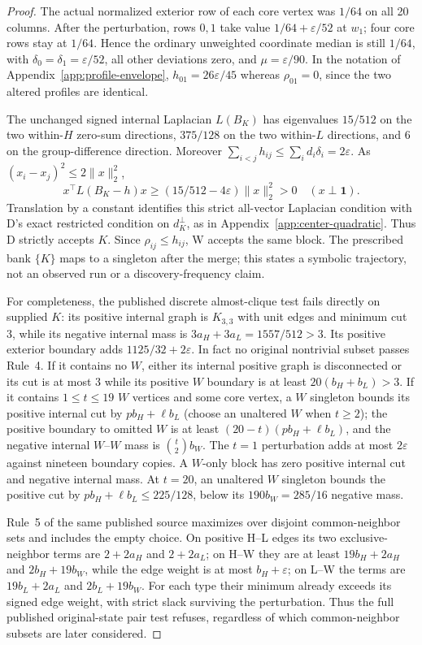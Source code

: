 \documentclass[sigconf,anonymous,review]{acmart}
\newcommand{\1}{\mathbf{1}}
\begin{document}
\begin{proof}
The actual normalized exterior row of each core vertex was $1/64$ on all
20 columns. After the perturbation, rows $0,1$ take value
$1/64+\varepsilon/52$ at $w_1$; four core rows stay at $1/64$. Hence the
ordinary unweighted coordinate median is still $1/64$, with
$\delta_0=\delta_1=\varepsilon/52$, all other deviations zero, and
$\mu=\varepsilon/90$. In the notation of
Appendix~\ref{app:profile-envelope}, $h_{01}=26\varepsilon/45$ whereas
$\rho_{01}=0$, since the two altered profiles are identical.

The unchanged signed internal Laplacian $L(B_K)$ has eigenvalues
$15/512$ on the two within-$H$ zero-sum directions, $375/128$ on the two
within-$L$ directions, and $6$ on the group-difference direction.
Moreover $\sum_{i<j}h_{ij}\le\sum_i d_i\delta_i=2\varepsilon$.
As $(x_i-x_j)^2\le2\lVert x\rVert_2^2$,
\[
x^\top L(B_K-h)x\ge
  (15/512-4\varepsilon)\lVert x\rVert_2^2>0
\quad(x\perp\1).
\]
Translation by a constant identifies this strict all-vector Laplacian
condition with D's exact restricted condition on $d_K^\perp$, as in
Appendix~\ref{app:center-quadratic}. Thus D strictly accepts $K$.
Since $\rho_{ij}\le h_{ij}$, W accepts the same block. The prescribed bank
$\{K\}$ maps to a singleton after the merge; this states a symbolic
trajectory, not an observed run or a discovery-frequency claim.

For completeness, the published discrete almost-clique test
\cite{bocker2011exact} fails directly on supplied $K$: its positive
internal graph is $K_{3,3}$ with unit edges and minimum cut 3, while its
negative internal mass is $3a_H+3a_L=1557/512>3$. Its positive exterior
boundary adds $1125/32+2\varepsilon$. In fact no original nontrivial
subset passes Rule~4. If it contains no $W$, either its internal positive
graph is disconnected or its cut is at most 3 while its positive $W$
boundary is at least $20(b_H+b_L)>3$. If it contains $1\le t\le19$
$W$ vertices and some core vertex, a $W$ singleton bounds its positive
internal cut by $pb_H+\ell b_L$ (choose an unaltered $W$ when $t\ge2$);
the positive boundary to omitted $W$ is at least
$(20-t)(pb_H+\ell b_L)$, and the negative internal $W$--$W$ mass is
$\binom{t}{2}b_W$. The $t=1$ perturbation adds at most
$2\varepsilon$ against nineteen boundary copies. A $W$-only block has
zero positive internal cut and negative internal mass. At $t=20$, an
unaltered $W$ singleton bounds the positive cut by
$pb_H+\ell b_L\le225/128$, below its $190b_W=285/16$ negative mass.

Rule~5 of the same published source maximizes over disjoint common-neighbor
sets and includes the empty choice. On positive H--L edges its two
exclusive-neighbor terms are $2+2a_H$ and $2+2a_L$; on H--W they are at least
$19b_H+2a_H$ and $2b_H+19b_W$, while the edge weight is at most
$b_H+\varepsilon$; on L--W the terms are
$19b_L+2a_L$ and $2b_L+19b_W$. For each type their minimum already exceeds
its signed edge weight, with strict slack surviving the perturbation.
Thus the full published original-state pair test refuses, regardless of
which common-neighbor subsets are later considered.
\end{proof}
\end{document}
